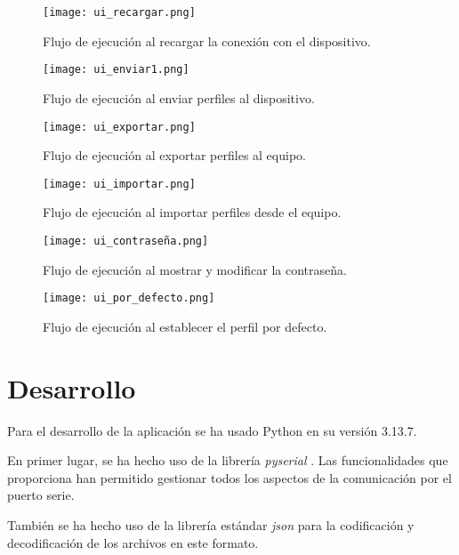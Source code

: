 \begin{figure}[h!]
    \centering
    \texttt{[image: ui\_recargar.png]}
    \caption{Flujo de ejecución al recargar la conexión con el dispositivo.}
    \label{fig:ui_recargar}
\end{figure}

\begin{figure}[h!]
    \centering
    \texttt{[image: ui\_enviar1.png]}
    \caption{Flujo de ejecución al enviar perfiles al dispositivo.}
    \label{fig:ui_enviar1}
\end{figure}

\begin{figure}[h!]
    \centering
    \texttt{[image: ui\_exportar.png]}
    \caption{Flujo de ejecución al exportar perfiles al equipo.}
    \label{fig:ui_exportar}
\end{figure}

\begin{figure}[h!]
    \centering
    \texttt{[image: ui\_importar.png]}
    \caption{Flujo de ejecución al importar perfiles desde el equipo.}
    \label{fig:ui_importar}
\end{figure}

\begin{figure}[h!]
    \centering
    \texttt{[image: ui\_contraseña.png]}
    \caption{Flujo de ejecución al mostrar y modificar la contraseña.}
    \label{fig:ui_contraseña}
\end{figure}

\begin{figure}[h!]
    \centering
    \texttt{[image: ui\_por\_defecto.png]}
    \caption{Flujo de ejecución al establecer el perfil por defecto.}
    \label{fig:ui_por_defecto}
\end{figure}

\section{Desarrollo}

Para el desarrollo de la aplicación se ha usado Python en su versión 3.13.7.

En primer lugar, se ha hecho uso de la librería \textit{pyserial} \cite{pyserial-lib}. Las funcionalidades que proporciona han permitido gestionar todos los aspectos de la comunicación por el puerto serie.

También se ha hecho uso de la librería estándar \textit{json} \cite{json-lib} para la codificación y decodificación de los archivos en este formato.

